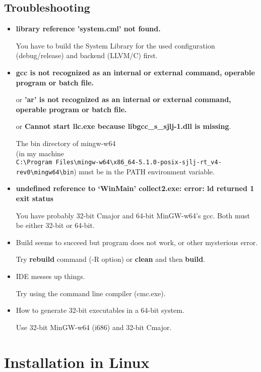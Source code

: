 \documentclass[oneside, a4paper, 11pt]{article}
\begin{document}
\subsection{Troubleshooting}

\begin{itemize}

\item
\textbf{library reference 'system.cml' not found.}

You have to build the System Library for the used configuration (debug/release) and backend (LLVM/C) first.

\item

\textbf{gcc is not recognized as an internal or external command, operable program or batch file.}

or \textbf{'ar' is not recognized as an internal or external command, operable program or batch file.}

or \textbf{Cannot start llc.exe because libgcc\_s\_sjlj-1.dll is missing}.

The bin directory of mingw-w64\\
(in my machine\\
\verb|C:\Program Files\mingw-w64\x86_64-5.1.0-posix-sjlj-rt_v4-rev0\mingw64\bin|)
must be in the PATH environment variable.

\item
\textbf{undefined reference to `WinMain' collect2.exe: error: ld returned 1 exit status}

You have probably 32-bit Cmajor and 64-bit MinGW-w64's gcc.
Both must be either 32-bit or 64-bit.

\item
Build seems to succeed but program does not work, or other mysterious error.

Try \textbf{rebuild} command (-R option) or \textbf{clean} and then \textbf{build}.

\item
IDE messes up things.

Try using the command line compiler (cmc.exe).

\item
How to generate 32-bit executables in a 64-bit system.

Use 32-bit MinGW-w64 (i686) and 32-bit Cmajor.
\end{itemize}

\section{Installation in Linux}
\end{document}
